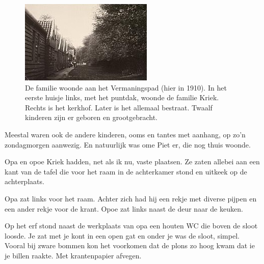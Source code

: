 \documentclass[10pt,twoside, openright]{memoir}
\begin{document}
\begin{figure}
\includegraphics[width=\textwidth]{img/ch3/Vermaningspad1910}
\caption*{\footnotesize De familie woonde aan het Vermaningspad (hier in 1910). In het eerste huisje links, met het puntdak, woonde de familie Kriek. Rechts is het kerkhof. Later is het allemaal bestraat. Twaalf kinderen zijn er geboren en grootgebracht.}
\end{figure}

Meestal waren ook de andere kinderen, ooms en tantes met aanhang, op zo’n zondagmorgen aanwezig. En natuurlijk was ome Piet er, die nog thuis woonde. 

Opa en opoe Kriek hadden, net als ik nu, vaste plaatsen. Ze zaten allebei aan een kant van de tafel die voor het raam in de achterkamer stond en uitkeek op de achterplaats. 

Opa zat links voor het raam. Achter zich had hij een rekje met diverse pijpen en een ander rekje voor de krant. Opoe zat links naast de deur naar de keuken.

Op het erf stond naast de werkplaats van opa een houten WC die boven de sloot loosde. Je zat met je kont in een open gat en onder je was de sloot, simpel. Vooral bij zware bommen kon het voorkomen dat de plons zo hoog kwam dat ie je billen raakte. Met krantenpapier afvegen.
\end{document}
